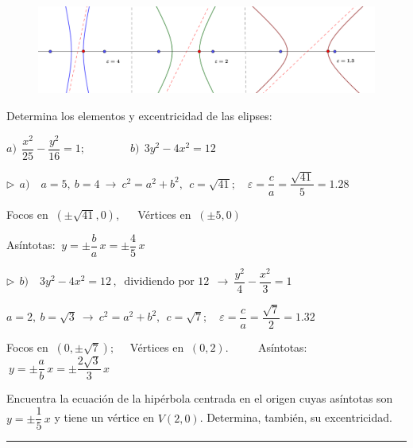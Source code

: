 \begin{figure}[H]
	\centering
	\includegraphics[width=.9\textwidth]{img-conicas/conicas31.png}
	\end{figure}

\vspace{4mm}
\begin{miejemplo}
	
	Determina los elementos y excentricidad de las elipses:
	
	\vspace{2mm}$a)\ \ \dfrac{x^2}{25}-\dfrac{y^2}{16}=1;\qquad \qquad b)\ \ 3y^2-4x^2=12$
	
	\vspace{6mm} $\triangleright \ \ a)\quad a=5,\ b=4 \ \to \ c^2=a^2+b^2 ,\ \ c=\sqrt{41};\quad \varepsilon=\dfrac c a = \dfrac {\sqrt{41}}{5}=1.28$
	
	\vspace{2mm} Focos en $\ (\pm \sqrt{41},0)$, $\quad$ Vértices en $\ (\pm 5,0)$
	
	\vspace{2mm} Asíntotas: $\ y=\pm \dfrac b a \, x=\pm \dfrac 45\, x$
	
	\vspace{6mm} $\triangleright \ \ b)\quad 3y^2-4x^2=12\, , \ \text{ dividiendo por } 12 \  \ \to \ \dfrac{y^2}{4}-\dfrac{x^2}{3}=1$
	
	\vspace{2mm} $a=2,\ b=\sqrt{3} \ \to \ c^2=a^2+b^2 , \ \ c=\sqrt{7};\quad \varepsilon =\dfrac c a = \dfrac {\sqrt{7}}{2}=1.32$
	
	\vspace{2mm} Focos en $\ (0,\pm \sqrt{7});\quad$ Vértices en $\ (0,2)$. $\qquad $ Asíntotas: $\ y=\pm \dfrac a b \, x= \pm \dfrac{2\sqrt{3}}{3}\, x$
\end{miejemplo}
\vspace{5mm}

\begin{miejercicio}

Encuentra la ecuación de la hipérbola centrada en el origen cuyas asíntotas son $y=\pm \dfrac 1 5 \, x$ y tiene un vértice en $V(2,0)$. Determina, también, su excentricidad.
\rule{250pt}{0.1pt}

\vspace{2mm}
	
\end{miejercicio}


